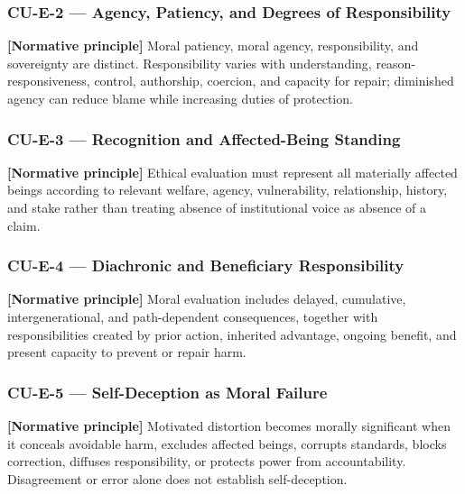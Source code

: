 \documentclass[
  11pt,
]{article}
\begin{document}
\subsubsection{CU-E-2 --- Agency, Patiency, and Degrees of
Responsibility}\label{cu-e-2-agency-patiency-and-degrees-of-responsibility}

\textbf{{[}Normative principle{]}} Moral patiency, moral agency,
responsibility, and sovereignty are distinct. Responsibility varies with
understanding, reason-responsiveness, control, authorship, coercion, and
capacity for repair; diminished agency can reduce blame while increasing
duties of protection.

\subsubsection{CU-E-3 --- Recognition and Affected-Being
Standing}\label{cu-e-3-recognition-and-affected-being-standing}

\textbf{{[}Normative principle{]}} Ethical evaluation must represent all
materially affected beings according to relevant welfare, agency,
vulnerability, relationship, history, and stake rather than treating
absence of institutional voice as absence of a claim.

\subsubsection{CU-E-4 --- Diachronic and Beneficiary
Responsibility}\label{cu-e-4-diachronic-and-beneficiary-responsibility}

\textbf{{[}Normative principle{]}} Moral evaluation includes delayed,
cumulative, intergenerational, and path-dependent consequences, together
with responsibilities created by prior action, inherited advantage,
ongoing benefit, and present capacity to prevent or repair harm.

\subsubsection{CU-E-5 --- Self-Deception as Moral
Failure}\label{cu-e-5-self-deception-as-moral-failure}

\textbf{{[}Normative principle{]}} Motivated distortion becomes morally
significant when it conceals avoidable harm, excludes affected beings,
corrupts standards, blocks correction, diffuses responsibility, or
protects power from accountability. Disagreement or error alone does not
establish self-deception.
\end{document}
